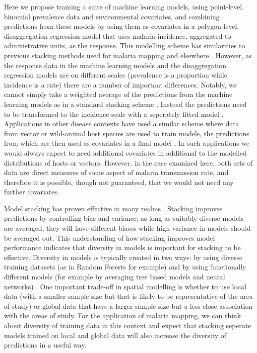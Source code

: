 \documentclass[review]{elsarticle}
\begin{document}
Here we propose training a suite of machine learning models, using point-level, binomial prevalence data and environmental covariates, and combining predictions from these models by using them as covariates in a polygon-level, disaggregation regression model that uses  malaria incidence, aggregated to administrative units, as the response.
This modelling scheme has similarities to previous stacking methods used for malaria mapping \citep{bhatt2017improved} and elsewhere \citep{wolpert1992stacked, sill2009feature, hao2019review, breiman1996stacked}.
However, as the response data in the machine learning models and the disaggregation regression models are on different scales (prevalence is a proportion while incidence is a rate) there are a number of important differences.
Notably, we cannot simply take a weighted average of the predictions from the machine learning models as in a standard stacking scheme \citep{sill2009feature, hao2019review}.
Instead the predictions  need to be transformed to the incidence scale with a seperately fitted model \citep{cameron2015defining}.
Applications in other disease contexts have used a similar scheme where data from vector or wild-animal host species are used to train models, the predictions from which are then used as covariates in a final model \citep{pigott2014mapping, shearer2016estimating}.
In such applications we would always expect to need additional covariates in additional to the modelled distributions of hosts or vectors.
However, in the case examined here, both sets of data are direct measures of some aspect of malaria transmission rate, and therefore it is possible, though not guaranteed, that we would not need any further covariates. 


Model stacking \citep{wolpert1992stacked} has proven effective in many realms \citep{bhatt2017improved, sill2009feature, hao2019review, breiman1996stacked}. 
Stacking improves predictions by controlling bias and variance; as long as suitably diverse models are averaged, they will have different biases while high variance in models should be averaged out.
This understanding of how stacking improves model performance indicates that diversity in models is important for stacking to be effective.
Diversity in models is typically created in two ways: by using diverse training datasets \citep{breiman1996bagging} (as in Random Forests for example) and by using functionally different models (for example by averaging tree based models and neural networks) \citep{breiman1996stacked}.
One important trade-off in spatial modelling is whether to use local data (with a smaller sample size but that is likely to be representative of the area of study) or global data that have a larger sample size but a less close association with the areas of study.
For the application of malaria mapping, we can think about diversity of training data in this context and expect that stacking seperate models trained on local and global data will also increase the diversity of predictions in a useful way.
\end{document}
